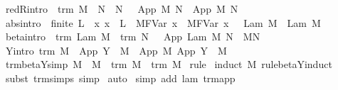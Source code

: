 \begin{isabellebody}
{\isacharbar}\ red{\isacharunderscore}R{\isacharbrackleft}intro{\isacharbrackright}{\isacharcolon}\ {\isachardoublequoteopen}{\isasymlbrakk}\ trm\ M\ {\isacharsemicolon}\ N\ {\isasymRightarrow}\ N{\isacharprime}\ {\isasymrbrakk}\ {\isasymLongrightarrow}\ App\ M\ N\ {\isasymRightarrow}\ App\ M\ N{\isacharprime}{\isachardoublequoteclose}\isanewline
{\isacharbar}\ abs{\isacharbrackleft}intro{\isacharbrackright}{\isacharcolon}\ {\isachardoublequoteopen}{\isasymlbrakk}\ finite\ L\ {\isacharsemicolon}\ {\isacharparenleft}{\isasymAnd}x{\isachardot}\ x\ {\isasymnotin}\ L\ {\isasymLongrightarrow}\ M{\isacharcircum}{\isacharparenleft}FVar\ x{\isacharparenright}\ {\isasymRightarrow}\ M{\isacharprime}{\isacharcircum}{\isacharparenleft}FVar\ x{\isacharparenright}{\isacharparenright}\ {\isasymrbrakk}\ {\isasymLongrightarrow}\ Lam\ M\ {\isasymRightarrow}\ Lam\ M{\isacharprime}{\isachardoublequoteclose}\isanewline
{\isacharbar}\ beta{\isacharbrackleft}intro{\isacharbrackright}{\isacharcolon}\ {\isachardoublequoteopen}{\isasymlbrakk}\ trm\ {\isacharparenleft}Lam\ M{\isacharparenright}\ {\isacharsemicolon}\ trm\ N\ {\isasymrbrakk}\ {\isasymLongrightarrow}\ App\ {\isacharparenleft}Lam\ M{\isacharparenright}\ N\ {\isasymRightarrow}\ M{\isacharcircum}N{\isachardoublequoteclose}\isanewline
{\isacharbar}\ Y{\isacharbrackleft}intro{\isacharbrackright}{\isacharcolon}\ {\isachardoublequoteopen}trm\ M\ {\isasymLongrightarrow}\ App\ {\isacharparenleft}Y\ {\isasymsigma}{\isacharparenright}\ M\ {\isasymRightarrow}\ App\ M\ {\isacharparenleft}App\ {\isacharparenleft}Y\ {\isasymsigma}{\isacharparenright}\ M{\isacharparenright}{\isachardoublequoteclose}\isanewline
\isanewline
{}\isamarkupfalse%
\ trm{\isacharunderscore}beta{\isacharunderscore}Y{\isacharunderscore}simp{}{\isacharcolon}\ {\isachardoublequoteopen}M\ {\isasymRightarrow}\ M{\isacharprime}\ {\isasymLongrightarrow}\ trm\ M\ {\isasymand}\ trm\ M{\isacharprime}{\isachardoublequoteclose}\isanewline
%
\isadelimproof
%
\endisadelimproof
%
\isatagproof
{}\isamarkupfalse%
\ rule\isanewline
{}\isamarkupfalse%
\ {\isacharparenleft}induct\ M{\isacharprime}\ rule{\isacharcolon}beta{\isacharunderscore}Y{\isachardot}induct{\isacharparenright}\isanewline
{}\isamarkupfalse%
\ {\isacharparenleft}subst\ trm{\isachardot}simps{\isacharcomma}\ simp{\isacharparenright}{\isacharplus}\isanewline
{}\isamarkupfalse%
\ auto{\isacharbrackleft}{}{\isacharbrackright}\isanewline
{}\isamarkupfalse%
\ {\isacharparenleft}simp\ add{\isacharcolon}\ lam\ trm{\isachardot}app{\isacharparenright}\isanewline

\end{isabellebody}
